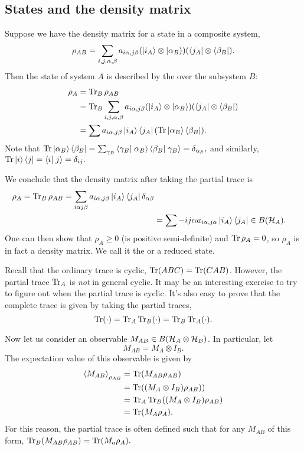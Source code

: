 \subsection*{States and the density matrix}
Suppose we have the density matrix for a state in a composite system,
\begin{equation}
    \rho_{AB}=\sum_{i,j,\alpha,\beta} a_{i\alpha,j\beta}(\left| i_A \right>\otimes \left| \alpha_B \right>)(\left< j_A \right|\otimes \left< \beta_B \right|).
\end{equation}
Then the state of system $A$ is described by the  over the subsystem $B$:
\begin{align}
    \rho_A &= \operatorname{Tr}_B \rho_{AB}\\
    &=\operatorname{Tr}_B \sum_{i,j,\alpha,\beta} a_{i\alpha,j\beta}(\left| i_A \right>\otimes \left| \alpha_B \right>)(\left< j_A \right|\otimes \left< \beta_B \right|)\\
    &= \sum a_{i\alpha,j\beta}\left| i_A \right>\left< j_A \right| (\operatorname{Tr}\left| \alpha_B \right>\left< \beta_B \right|).
\end{align}
Note that $\Tr \ket{\alpha_B}\bra{\beta_B}=\sum_{\gamma_B} \braket{\gamma_B}{\alpha_B}\braket{\beta_B}{\gamma_B}=\delta_{\alpha_\beta},$ and similarly, $\Tr\ket{i}\bra{j}=\braket{i}{j}=\delta_{ij}.$

We conclude that the density matrix after taking the partial trace is
\begin{align}
    \rho_A =\operatorname{Tr}_B \rho_{AB} = \sum_{i\alpha j\beta} a_{i\alpha,j\beta}\left| i_A \right>\left< j_A \right|\delta_{\alpha\beta}\\
    &=\sum-{ij\alpha} a_{i\alpha,j\alpha} \left| i_A \right>\left< j_A \right| \in B(\mathcal H_A).
\end{align}
One can then show that $\rho_A \geq 0$ (is positive semi-definite) and $\operatorname{Tr} \rho_A=0$, so $\rho_A$ is in fact a density matrix. We call it the  or a reduced state.

Recall that the ordinary trace is cyclic, $\operatorname{Tr}(ABC)=\operatorname{Tr}(CAB)$. However, the partial trace $\operatorname{Tr}_A$ is \emph{not} in  general cyclic. It may be an interesting exercise to try to figure out when the partial trace is cyclic. It's also easy to prove that the complete trace is given by taking the partial traces,
\begin{equation}
    \operatorname{Tr}(\cdot)=\operatorname{Tr}_A \operatorname{Tr}_B(\cdot) = \operatorname{Tr}_B \operatorname{Tr}_A(\cdot).
\end{equation}

Now let us consider an observable $M_{AB} \in B(\mathcal H_A \otimes \mathcal H_B)$. In particular, let
\begin{equation}
    M_{AB}=M_A \otimes I_B.
\end{equation}
The expectation value of this observable is given by
\begin{align*}
    \left< M_{AB} \right>_{\rho_{AB}} &= \operatorname{Tr} (M_{AB} \rho_{AB})\\
    &= \operatorname{Tr}((M_A\otimes I_B) \rho_{AB}))\\
    &= \operatorname{Tr}_A \operatorname{Tr}_B ((M_A \otimes I_B)\rho_{AB})\\
    &= \operatorname{Tr}(M_A \rho_A).
\end{align*}
For this reason, the partial trace is often defined such that for any $M_{AB}$ of this form, $\operatorname{Tr}_B(M_{AB}\rho_{AB})=\operatorname{Tr}(M_a \rho_A).$

